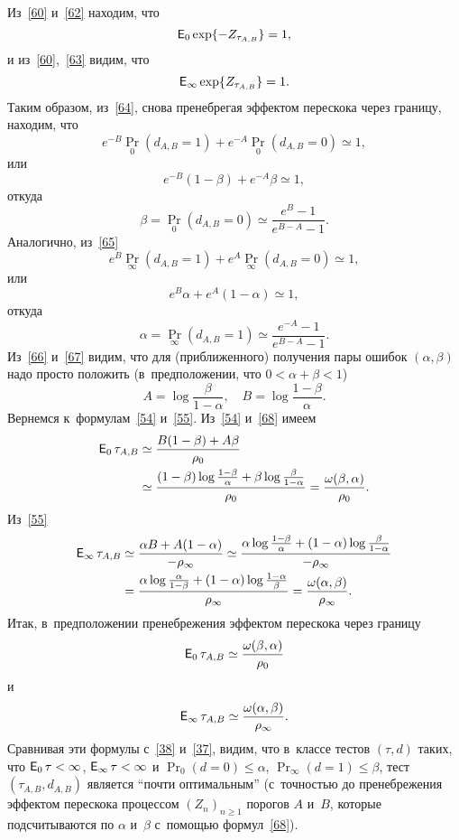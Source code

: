 Из~\eqref{60} и~\eqref{62} находим, что
\begin{equation}
\label{64}%
\E_0\exp\{-Z_{\tau_{A,B}}\}=1,
\end{equation}
и из~\eqref{60},~\eqref{63} видим, что
\begin{equation}
\label{65}%
\E_{\infty}\exp\{Z_{\tau_{A,B}}\}=1.
\end{equation}
Таким образом, из~\eqref{64}, снова пренебрегая эффектом перескока
через границу, находим, что
\[
e^{-B}\Pr_0\left( d_{A,B}=1\right)+e^{-A}\Pr_0\left( d_{A,B}=0\right)\simeq1,
\]
или
\[
e^{-B}(1-\beta)+e^{-A}\beta\simeq1,
\]
откуда
\begin{equation}
\label{66}%
\beta
=\Pr_0\left( d_{A,B}
=0\right)\simeq\frac{e^B-1}{e^{B-A}-1}.
\end{equation}
Аналогично, из~\eqref{65}
\[
e^B\Pr_{\infty}\left( d_{A,B}
=1\right)+e^A\Pr_{\infty}\left( d_{A,B}=0\right)
\simeq1,
\]
или
\[
e^B\alpha+e^A(1-\alpha)\simeq1,
\]
откуда
\begin{equation}
\label{67}%
\alpha
=\Pr_{\infty}\left( d_{A,B}=1\right)
\simeq\frac{e^{-A}-1}{e^{B-A}-1}.
\end{equation}
Из~\eqref{66} и~\eqref{67} видим, что для (приближенного)
получения пары ошибок $(\alpha,\beta)$ надо просто положить
(в~предположении, что $0<\alpha+\beta<1$)
\begin{equation}
\label{68}%
A=\log\frac{\beta}{1-\alpha},
\quad
B=\log\frac{1-\beta}{\alpha}.
\end{equation}
Вернемся к~формулам~\eqref{54} и~\eqref{55}. Из~\eqref{54}
и~\eqref{68} имеем
\begin{align*}
\E_0\tau_{A,B}
&
\simeq\frac{B(1-\beta)+A\beta}{\rho_0}\\
&
\simeq\frac{(1-\beta)\log\frac{1-\beta}{\alpha}+\beta\log\frac{\beta}{1-\alpha}}{\rho_0}
=\frac{\omega(\beta,\alpha)}{\rho_0}.
\end{align*}
Из~\eqref{55}
\begin{align*}
\E_{\infty}\tau_{A,B}
&
\simeq\frac{\alpha B+A(1-\alpha)}{-\rho_{\infty}}
\simeq\frac{\alpha\log\frac{1-\beta}{\alpha}+(1-\alpha)\log\frac{\beta}{1-\alpha}}{-\rho_{\infty}}\\
&
=\frac{\alpha\log\frac{\alpha}{1-\beta}+(1-\alpha)\log\frac{1-\alpha}{\beta}}{\rho_{\infty}}
=\frac{\omega(\alpha,\beta)}{\rho_{\infty}}.
\end{align*}
Итак, в~предположении пренебрежения эффектом перескока через
границу
\begin{equation}
\label{69}%
\E_0\tau_{A,B}\simeq\frac{\omega(\beta,\alpha)}{\rho_0}
\end{equation}
и
\begin{equation}
\label{70}%
\E_{\infty}\tau_{A,B}\simeq\frac{\omega(\alpha,\beta)}{\rho_{\infty}}.
\end{equation}
Сравнивая эти формулы с~\eqref{38} и~\eqref{37}, видим, что
в~классе тестов $(\tau,d)$ таких, что $\E_0\tau<\infty$,
$\E_{\infty}\tau<\infty$ и $\Pr_0(d=0)\le\alpha$,
$\Pr_{\infty}(d=1)\le\beta$, тест $(\tau_{A,B},d_{A,B})$ является
``почти оптимальным'' (с~точностью до пренебрежения эффектом
перескока процессом $(Z_n)_{n\ge1}$ порогов $A$ и~$B$, которые
подсчитываются по $\alpha$ и~$\beta$ с~помощью формул~\eqref{68}).

